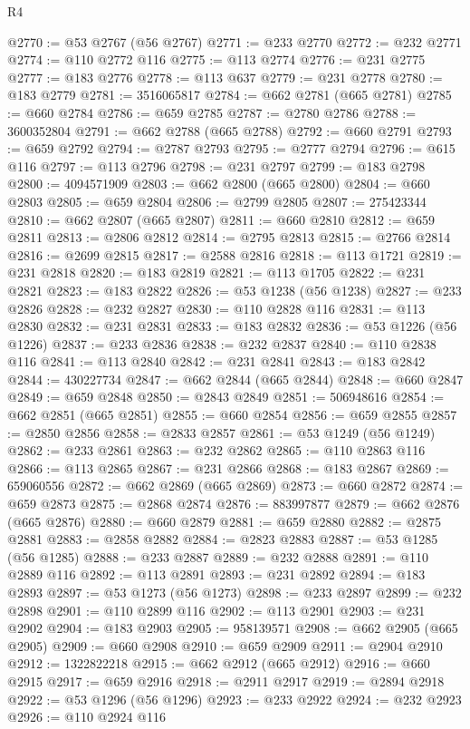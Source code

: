 \begin{lexlean}{R4}
\begin{coremodule}
@2770 := @53 @2767 (@56 @2767)
@2771 := @233 @2770
@2772 := @232 @2771
@2774 := @110 @2772 @116
@2775 := @113 @2774
@2776 := @231 @2775
@2777 := @183 @2776
@2778 := @113 @637
@2779 := @231 @2778
@2780 := @183 @2779
@2781 := 3516065817
@2784 := @662 @2781 (@665 @2781)
@2785 := @660 @2784
@2786 := @659 @2785
@2787 := @2780 @2786
@2788 := 3600352804
@2791 := @662 @2788 (@665 @2788)
@2792 := @660 @2791
@2793 := @659 @2792
@2794 := @2787 @2793
@2795 := @2777 @2794
@2796 := @615 @116
@2797 := @113 @2796
@2798 := @231 @2797
@2799 := @183 @2798
@2800 := 4094571909
@2803 := @662 @2800 (@665 @2800)
@2804 := @660 @2803
@2805 := @659 @2804
@2806 := @2799 @2805
@2807 := 275423344
@2810 := @662 @2807 (@665 @2807)
@2811 := @660 @2810
@2812 := @659 @2811
@2813 := @2806 @2812
@2814 := @2795 @2813
@2815 := @2766 @2814
@2816 := @2699 @2815
@2817 := @2588 @2816
@2818 := @113 @1721
@2819 := @231 @2818
@2820 := @183 @2819
@2821 := @113 @1705
@2822 := @231 @2821
@2823 := @183 @2822
@2826 := @53 @1238 (@56 @1238)
@2827 := @233 @2826
@2828 := @232 @2827
@2830 := @110 @2828 @116
@2831 := @113 @2830
@2832 := @231 @2831
@2833 := @183 @2832
@2836 := @53 @1226 (@56 @1226)
@2837 := @233 @2836
@2838 := @232 @2837
@2840 := @110 @2838 @116
@2841 := @113 @2840
@2842 := @231 @2841
@2843 := @183 @2842
@2844 := 430227734
@2847 := @662 @2844 (@665 @2844)
@2848 := @660 @2847
@2849 := @659 @2848
@2850 := @2843 @2849
@2851 := 506948616
@2854 := @662 @2851 (@665 @2851)
@2855 := @660 @2854
@2856 := @659 @2855
@2857 := @2850 @2856
@2858 := @2833 @2857
@2861 := @53 @1249 (@56 @1249)
@2862 := @233 @2861
@2863 := @232 @2862
@2865 := @110 @2863 @116
@2866 := @113 @2865
@2867 := @231 @2866
@2868 := @183 @2867
@2869 := 659060556
@2872 := @662 @2869 (@665 @2869)
@2873 := @660 @2872
@2874 := @659 @2873
@2875 := @2868 @2874
@2876 := 883997877
@2879 := @662 @2876 (@665 @2876)
@2880 := @660 @2879
@2881 := @659 @2880
@2882 := @2875 @2881
@2883 := @2858 @2882
@2884 := @2823 @2883
@2887 := @53 @1285 (@56 @1285)
@2888 := @233 @2887
@2889 := @232 @2888
@2891 := @110 @2889 @116
@2892 := @113 @2891
@2893 := @231 @2892
@2894 := @183 @2893
@2897 := @53 @1273 (@56 @1273)
@2898 := @233 @2897
@2899 := @232 @2898
@2901 := @110 @2899 @116
@2902 := @113 @2901
@2903 := @231 @2902
@2904 := @183 @2903
@2905 := 958139571
@2908 := @662 @2905 (@665 @2905)
@2909 := @660 @2908
@2910 := @659 @2909
@2911 := @2904 @2910
@2912 := 1322822218
@2915 := @662 @2912 (@665 @2912)
@2916 := @660 @2915
@2917 := @659 @2916
@2918 := @2911 @2917
@2919 := @2894 @2918
@2922 := @53 @1296 (@56 @1296)
@2923 := @233 @2922
@2924 := @232 @2923
@2926 := @110 @2924 @116

\end{coremodule}
\end{lexlean}
